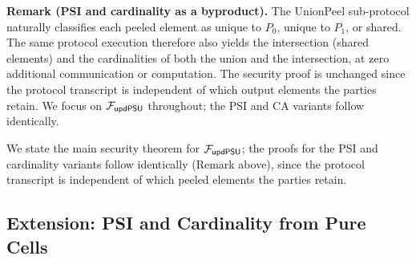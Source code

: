 	\begin{center}
\label{fig:f-fupsu}

\smallskip\noindent\textbf{Remark (PSI and cardinality as a byproduct).}
The UnionPeel sub-protocol naturally classifies each peeled element as unique
to $P_0$, unique to $P_1$, or shared. The same protocol execution therefore
also yields the intersection (shared elements) and the cardinalities of both
the union and the intersection, at zero additional communication or computation.
The security proof is unchanged since the protocol transcript is independent
of which output elements the parties retain. We focus on $\mathcal{F}_{\mathsf{updPSU}}$
throughout; the PSI and CA variants follow identically.
\end{center}

	We state the main security theorem for $\mathcal{F}_{\mathsf{updPSU}}$;
	the proofs for the PSI and cardinality variants follow identically
	(Remark above), since the protocol transcript is independent of which
	peeled elements the parties retain.

\subsection{Extension: PSI and Cardinality from Pure Cells}
\label{sec:psi-ext}

